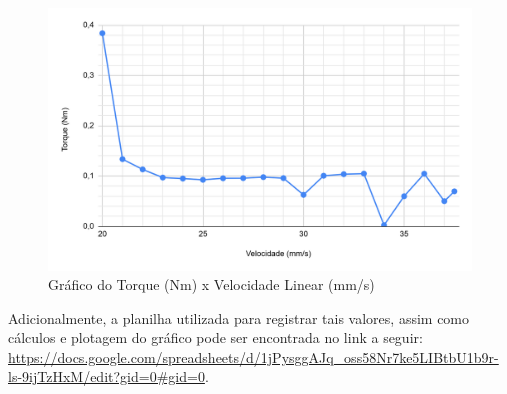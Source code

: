 \begin{figure}[H]
    \centering
    \includegraphics[width=0.85\linewidth]{images/Eletrica/Figura12.png}
    \caption{Gráfico do Torque (Nm) x Velocidade Linear (mm/s)}
    \label{fig:curva-motor}
\end{figure}

Adicionalmente, a planilha utilizada para registrar tais valores, assim como cálculos e plotagem do gráfico pode ser encontrada no link a seguir:  \url{https://docs.google.com/spreadsheets/d/1jPysggAJq_oss58Nr7ke5LIBtbU1b9r-ls-9ijTzHxM/edit?gid=0#gid=0}.
